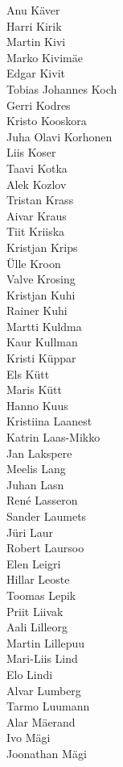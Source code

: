 \begin{multicols}{3}
Anu Käver\\
Harri Kirik\\
Martin Kivi\\
Marko Kivimäe\\
Edgar Kivit\\
Tobias Johannes Koch\\
Gerri Kodres\\
Kristo Kooskora\\
Juha Olavi Korhonen\\
Liis Koser\\
Taavi Kotka\\
Alek Kozlov\\
Tristan Krass\\
Aivar Kraus\\
Tiit Kriiska\\
Kristjan Krips\\
Ülle Kroon\\
Valve Krosing\\
Kristjan Kuhi\\
Rainer Kuhi\\
Martti Kuldma\\
Kaur Kullman\\
Kristi Küppar\\
Els Kütt\\
Maris Kütt\\
Hanno Kuus\\
Kristiina Laanest\\
Katrin Laas-Mikko\\
Jan Lakspere\\
Meelis Lang\\
Juhan Lasn\\
René Lasseron\\
Sander Laumets\\
Jüri Laur\\
Robert Laursoo\\
Elen Leigri\\
Hillar Leoste\\
Toomas Lepik\\
Priit Liivak\\
Aali Lilleorg\\
Martin Lillepuu\\
Mari-Liis Lind\\
Elo Lindi\\
Alvar Lumberg\\
Tarmo Luumann\\
Alar Mäerand\\
Ivo Mägi\\
Joonathan Mägi\\

\end{multicols}
